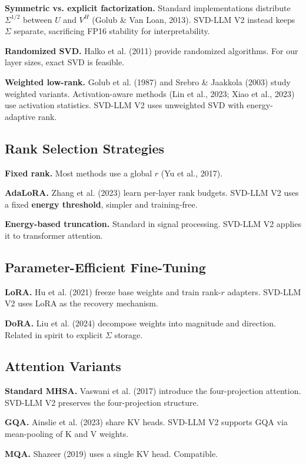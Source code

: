 \textbf{Symmetric vs. explicit factorization.} Standard implementations distribute 
$\Sigma^{1/2}$ between $U$ and $V^H$ (Golub \& Van Loan, 2013). SVD-LLM V2 
instead keeps $\Sigma$ separate, sacrificing FP16 stability for 
interpretability.

\textbf{Randomized SVD.} Halko et al. (2011) provide randomized algorithms. For 
our layer sizes, exact SVD is feasible.

\textbf{Weighted low-rank.} Golub et al. (1987) and Srebro \& Jaakkola (2003) study 
weighted variants. Activation-aware methods (Lin et al., 2023; Xiao et al., 
2023) use activation statistics. SVD-LLM V2 uses unweighted SVD with 
energy-adaptive rank.

\subsection{Rank Selection Strategies}

\textbf{Fixed rank.} Most methods use a global $r$ (Yu et al., 2017).

\textbf{AdaLoRA.} Zhang et al. (2023) learn per-layer rank budgets. SVD-LLM V2 
uses a fixed \textbf{energy threshold}, simpler and training-free.

\textbf{Energy-based truncation.} Standard in signal processing. SVD-LLM V2 
applies it to transformer attention.

\subsection{Parameter-Efficient Fine-Tuning}

\textbf{LoRA.} Hu et al. (2021) freeze base weights and train rank-$r$ adapters. 
SVD-LLM V2 uses LoRA as the recovery mechanism.

\textbf{DoRA.} Liu et al. (2024) decompose weights into magnitude and direction. 
Related in spirit to explicit $\Sigma$ storage.

\subsection{Attention Variants}

\textbf{Standard MHSA.} Vaswani et al. (2017) introduce the four-projection 
attention. SVD-LLM V2 preserves the four-projection structure.

\textbf{GQA.} Ainslie et al. (2023) share KV heads. SVD-LLM V2 supports GQA via 
mean-pooling of K and V weights.

\textbf{MQA.} Shazeer (2019) uses a single KV head. Compatible.


